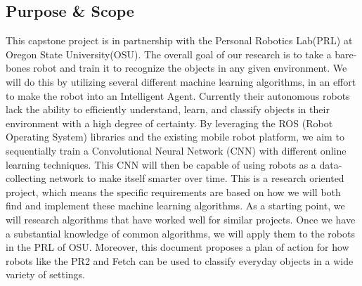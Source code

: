 \documentclass[draftclsnofoot, onecolumn, 10pt, compsoc]{IEEEtran}
\begin{document}
\subsection{Purpose \& Scope}
This capstone project is in partnership with the Personal Robotics Lab(PRL) at Oregon State University(OSU). The overall goal of our research is to take a bare-bones robot and train it to recognize the objects in any given environment. We will do this by utilizing several different machine learning algorithms, in an effort to make the robot into an Intelligent Agent. Currently their autonomous robots lack the ability to efficiently understand, learn, and classify objects in their environment with a high degree of certainty. By leveraging the ROS (Robot Operating System) libraries and the existing mobile robot platform, we aim to sequentially train a Convolutional Neural Network (CNN) with different online learning techniques. This CNN will then be capable of using robots as a data-collecting network to make itself smarter over time. 
	This is a research oriented project, which means the specific requirements are based on how we will both find and implement these machine learning algorithms. As a starting point, we will research algorithms that have worked well for similar projects. Once we have a substantial knowledge of common algorithms, we will apply them to the robots in the PRL of OSU. Moreover, this document proposes a plan of action for how robots like the PR2 and Fetch can be used to classify everyday objects in a wide variety of settings.
\end{document}
